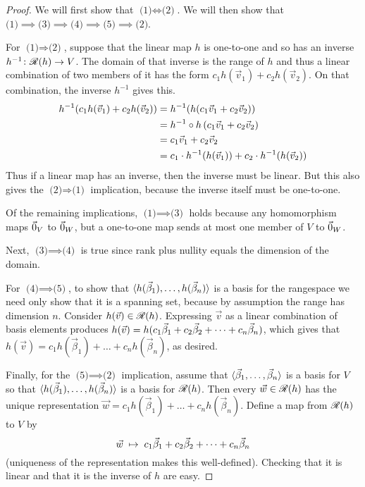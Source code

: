 \begin{proof}
We will first show that \( \text{(1)} \Longleftrightarrow \text{(2)} \).
We will then show that
\(
  \text{(1)}\implies \text{(3)}\implies 
  \text{(4)}\implies \text{(5)}\implies \text{(2)}
\).

For \( \text{(1)} \Longrightarrow \text{(2)} \),
suppose that the linear map $h$ is one-to-one and so has an inverse
$\mbox{$h^{-1}\colon \mathscr{R}(h)\to V$}$.
The domain of that inverse is the range of $h$ and thus a linear combination
of  two members of it has the form $c_1h(\vec{v}_1)+c_2h(\vec{v}_2)$.
On that combination, the inverse \( h^{-1} \) gives this.
\begin{align*}
  h^{-1}(c_1h(\vec{v}_1)+c_2h(\vec{v}_2))
  &=h^{-1}(h(c_1\vec{v}_1+c_2\vec{v}_2))  \\
  &=h^{-1}\mathbin\circ h\,(c_1\vec{v}_1+c_2\vec{v}_2) \\
  &=c_1\vec{v}_1+c_2\vec{v}_2 \\
  &=c_1\cdot h^{-1}(h(\vec{v}_1))+c_2\cdot h^{-1}(h(\vec{v}_2))
\end{align*}
Thus if a linear map has an inverse, then
the inverse must be linear.
But this also gives the \( \text{(2)} \Longrightarrow \text{(1)} \) 
implication, because the inverse itself must be one-to-one.

Of the remaining implications,
\( \text{(1)}\implies \text{(3)} \) holds because any
homomorphism maps \( \vec{0}_V \) to \( \vec{0}_W \), but a one-to-one map sends at
most one member of \( V \) to \( \vec{0}_W \).

Next, \( \text{(3)} \implies \text{(4)} \) is true since rank
plus nullity equals the dimension of the domain.

For
\( \text{(4)} \implies \text{(5)} \), to show that
\( \langle h(\vec{\beta}_1),\dots,h(\vec{\beta}_n)\rangle \)
is a basis for the rangespace we need only show that it is a spanning set,
because by assumption the range has dimension $n$.
Consider $h(\vec{v})\in\mathscr{R}(h)$.
Expressing $\vec{v}$ as a linear combination of basis elements produces
\( h(\vec{v})=h(c_1\vec{\beta}_1+c_2\vec{\beta}_2+\cdots +c_n\vec{\beta}_n) \),
which gives that 
\( h(\vec{v})=c_1h(\vec{\beta}_1)+\dots+c_nh(\vec{\beta}_n) \),
as desired.

Finally, for the \( \text{(5)}\implies \text{(2)} \) implication, assume
that \( \langle\vec{\beta}_1,\dots,\vec{\beta}_n\rangle \)
is a basis for \( V \) so that
\( \langle h(\vec{\beta}_1),\dots,h(\vec{\beta}_n)\rangle \)
is a basis for \( \mathscr{R}(h) \).
Then every
\( \vec{w}\in\mathscr{R}(h) \) has the unique representation
\( \vec{w}=c_1h(\vec{\beta}_1)+\dots+c_nh(\vec{\beta}_n) \).
Define a map from \( \mathscr{R}(h) \) to $V$ by
\begin{equation*}
    \vec{w} \;\mapsto\; c_1\vec{\beta}_1+c_2\vec{\beta}_2+\cdots +c_n\vec{\beta}_n
\end{equation*}
(uniqueness of the representation makes this well-defined).
Checking that it is linear and that
it is the inverse of $h$ are easy.
\end{proof}

